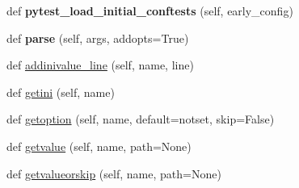 \begin{DoxyCompactItemize}
\item 
\mbox{\label{class__pytest_1_1config_1_1_config_ac1394505bc613c3fce64c513b565735c}} 
def {\bfseries pytest\+\_\+load\+\_\+initial\+\_\+conftests} (self, early\+\_\+config)
\item 
\mbox{\label{class__pytest_1_1config_1_1_config_af538189fb5b586e07dac52bc20bc04db}} 
def {\bfseries parse} (self, args, addopts=True)
\item 
def \hyperlink{class__pytest_1_1config_1_1_config_adcbe2df485fb1f99d289b25bd79f2715}{addinivalue\+\_\+line} (self, name, line)
\item 
def \hyperlink{class__pytest_1_1config_1_1_config_a154273f31343c85ab8562173b623441e}{getini} (self, name)
\item 
def \hyperlink{class__pytest_1_1config_1_1_config_a79e94d2eff1c18db944f563f222c617b}{getoption} (self, name, default=notset, skip=False)
\item 
def \hyperlink{class__pytest_1_1config_1_1_config_a0692b1f22b04733c02019c86f9141030}{getvalue} (self, name, path=None)
\item 
def \hyperlink{class__pytest_1_1config_1_1_config_a83ddb8e23b7d52dc3beafe987b88cec0}{getvalueorskip} (self, name, path=None)
\end{DoxyCompactItemize}

